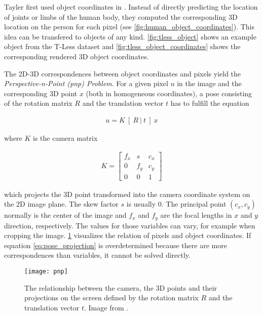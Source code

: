 Tayler \etal first used object coordinates in \cite{tsharp}. Instead of directly predicting the location of joints or limbs of the human body, they computed the corresponding 3D location on the person for each pixel (see \fig \ref{fig:human_object_coordinates}). This idea can be transfered to objects of any kind. \fig \ref{fig:tless_object} shows an example object from the T-Less dataset \cite{tless} and \fig \ref{fig:tless_object_coordinates} shows the corresponding rendered 3D object coordinates.

The 2D-3D correspondences between object coordinates and pixels yield the \textit{Perspective-n-Point (\gls{pnp}) Problem}. For a given pixel $u$ in the image and the corresponding 3D point $x$ (both in homogeneous coordinates), a pose consisting of the rotation matrix $R$ and the translation vector $t$ has to fulfill the equation

\begin{align}
 u = K \ [ \ R \ | \ t \ ] \ x \label{eq:pose_projection}
\end{align} 
 
\noindent where $K$ is the camera matrix

\begin{align}
K = \begin{bmatrix}
f_x & s & c_x \\
0 & f_y & c_y \\
0 & 0 & 1 
\end{bmatrix}
\end{align}

\noindent which projects the 3D point transformed into the camera coordinate system on the 2D image plane. The skew factor $s$ is usually $0$. The principal point $(c_x, c_y)$ normally is the center of the image and $f_x$ and $f_y$ are the focal lengths in $x$ and $y$ direction, respectively. The values for those variables can vary, for example when cropping the image. \fig \ref{fig:pnp} visualizes the relation of pixels and object coordinates. If equation \ref{eq:pose_projection} is overdetermined because there are more correspondences than variables, it cannot be solved directly.

\begin{figure}[!tbp]
	\centering
    \texttt{[image: pnp]}
    \caption{The relationship between the camera, the 3D points and their projections on the screen defined by the rotation matrix $R$ and the translation vector $t$. Image from \cite{opencv_pnp}.}
    	\label{fig:pnp}
\end{figure} 

